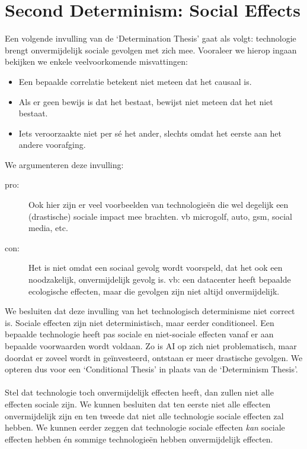 \documentclass[../summary.tex]{subfiles}
\begin{document}
	\section{Second Determinism: Social Effects}
	Een volgende invulling van de `Determination Thesis' gaat als volgt: technologie brengt onvermijdelijk sociale gevolgen met zich mee. Vooraleer we hierop ingaan bekijken we enkele veelvoorkomende misvattingen:
	\begin{itemize}
		\item Een bepaalde correlatie betekent niet meteen dat het causaal is.
		\item Als er geen bewijs is dat het bestaat, bewijst niet meteen dat het niet bestaat.
		\item Iets veroorzaakte niet per sé het ander, slechts omdat het eerste aan het andere voorafging.
	\end{itemize}
	We argumenteren deze invulling:
	\begin{description}
		\item[pro:] Ook hier zijn er veel voorbeelden van technologieën die wel degelijk een (drastische) sociale impact mee brachten. vb microgolf, auto, gsm, social media, etc.
		\item[con:] Het is niet omdat een sociaal gevolg wordt voorspeld, dat het ook een noodzakelijk, onvermijdelijk gevolg is. vb: een datacenter heeft bepaalde ecologische effecten, maar die gevolgen zijn niet altijd onvermijdelijk. 
	\end{description}
	We besluiten dat deze invulling van het technologisch determinisme niet correct is. Sociale effecten zijn niet deterministisch, maar eerder conditioneel. Een bepaalde technologie heeft pas sociale en niet-sociale effecten vanaf er aan bepaalde voorwaarden wordt voldaan. Zo is AI op zich niet problematisch, maar doordat er zoveel wordt in geïnvesteerd, ontstaan er meer drastische gevolgen. We opteren dus voor een `Conditional Thesis' in plaats van de `Determinism Thesis'.\\
	\\
	Stel dat technologie toch onvermijdelijk effecten heeft, dan zullen niet alle effecten sociale zijn. We kunnen besluiten dat ten eerste niet alle effecten onvermijdelijk zijn en ten tweede dat niet alle technologie sociale effecten zal hebben. We kunnen eerder zeggen dat technologie sociale effecten \emph{kan} sociale effecten hebben én sommige technologieën hebben onvermijdelijk effecten. 
	
\end{document}
